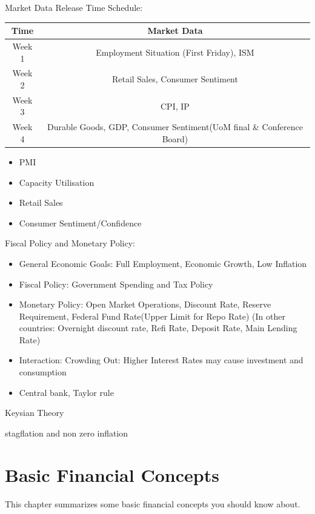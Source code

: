 \documentclass[11pt, openany]{book}              %
\begin{document}
Market Data Release Time Schedule:

\begin{center}
 \begin{tabular}{||c c||} 
 \hline
 Time & Market Data \\ [0.5ex] 
 \hline
 Week 1 & Employment Situation (First Friday), ISM \\ 
 Week 2 & Retail Sales, Consumer Sentiment \\ 
 Week 3 & CPI, IP \\ 
 Week 4 & Durable Goods, GDP, Consumer Sentiment(UoM final \& Conference Board) \\ 
 \hline
\end{tabular}
\end{center}

\begin{itemize}
    \item PMI 
    \item Capacity Utilisation 
    \item Retail Sales
    \item Consumer Sentiment/Confidence 
\end{itemize}
Fiscal Policy and Monetary Policy:

\begin{itemize}
	\item General Economic Goals: Full Employment, Economic Growth, Low Inflation
	\item Fiscal Policy: Government Spending and Tax Policy
    \item Monetary Policy: Open Market Operations, Discount Rate, Reserve Requirement, Federal Fund Rate(Upper Limit for Repo Rate) (In other countries: Overnight discount rate, Refi Rate, Deposit Rate, Main Lending Rate) 
    \item Interaction: Crowding Out: Higher Interest Rates may cause investment and consumption 
    \item Central bank, Taylor rule
\end{itemize}


Keysian Theory 

stagflation and non zero inflation




\chapter{Basic Financial Concepts}                %

This chapter summarizes some basic financial concepts you should know about.
\end{document}
